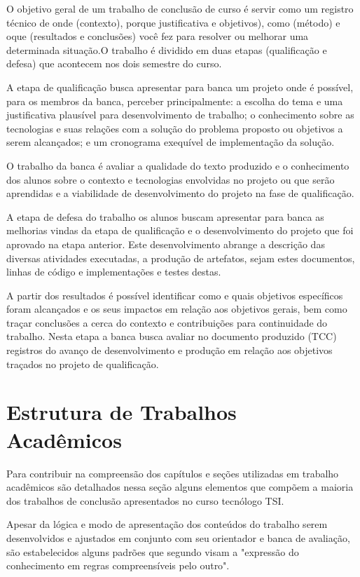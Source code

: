 O objetivo geral de um trabalho de conclusão de curso é servir como um registro técnico de onde (contexto), porque  justificativa e objetivos), como (método) e oque (resultados e conclusões) você fez para resolver ou melhorar uma determinada situação.O trabalho é dividido em duas etapas (qualificação e defesa) que acontecem nos dois semestre do curso. 

A etapa de qualificação busca apresentar para banca um projeto onde é possível, para os membros da banca, perceber principalmente: a escolha do tema e uma justificativa plausível para desenvolvimento de trabalho; o conhecimento sobre as tecnologias e suas relações com a solução do problema proposto ou objetivos a serem alcançados; e um cronograma exequível de implementação da solução. 

O trabalho da banca é avaliar a qualidade do texto produzido e o conhecimento dos alunos sobre o contexto e tecnologias envolvidas no projeto ou que serão aprendidas e a viabilidade de desenvolvimento do projeto na fase de qualificação.

A etapa de defesa do trabalho os alunos buscam apresentar para banca as melhorias vindas da etapa de qualificação e o desenvolvimento do projeto que foi aprovado na etapa anterior. Este desenvolvimento abrange a descrição das diversas atividades executadas, a produção de artefatos, sejam estes documentos, linhas de código e implementações e testes destas. 

A partir dos resultados é possível identificar como e quais objetivos específicos foram alcançados e os seus impactos em relação aos objetivos gerais, bem como traçar conclusões a cerca do contexto e contribuições para continuidade do trabalho. Nesta etapa a banca busca avaliar no documento produzido (TCC) registros do avanço de desenvolvimento e produção em relação aos objetivos traçados no projeto de qualificação.

\section{Estrutura de Trabalhos Acadêmicos}
Para contribuir na compreensão dos capítulos e seções utilizadas em trabalho acadêmicos são detalhados nessa seção alguns elementos que compõem a maioria dos trabalhos de conclusão apresentados no curso tecnólogo TSI. 

Apesar da lógica e modo de apresentação dos conteúdos do trabalho serem desenvolvidos e ajustados em conjunto com seu orientador e banca de avaliação, são estabelecidos alguns padrões que segundo \citeauthor{abnt} visam a "expressão do conhecimento em regras compreensíveis pelo outro". 

